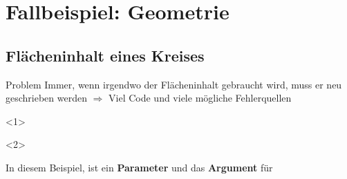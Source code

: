 \livecoding


\subtitle{Kapitel 6: wie Funktionen funktionieren}


\section{Fallbeispiel: Geometrie}
\begin{frame}[c]
    \slidehead

    \begin{figure}
        \centering
    \end{figure}

\end{frame}

\subsection{Flächeninhalt eines Kreises}
\begin{frame}
    \slidehead

    \begin{block}{Problem}
        Immer, wenn irgendwo der Flächeninhalt gebraucht wird, muss er neu geschrieben werden $\Rightarrow$ Viel Code und viele mögliche Fehlerquellen
    \end{block}
\end{frame}

\begin{frame}
    \slidehead
    \vspace{-1ex}
    \begin{onlyenv}<1>
    \end{onlyenv}

    \begin{onlyenv}<2>
    \end{onlyenv}
    \pause
    In diesem Beispiel, ist  ein \textbf{Parameter} und  das \textbf{Argument} für 
\end{frame}

